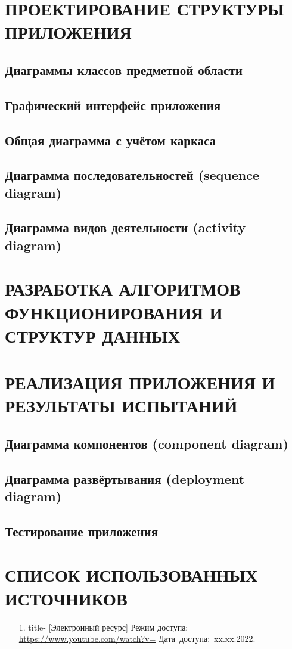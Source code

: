 \documentclass[12pt, a4paper, simple]{eskdtext}
\begin{document}
    \section{ПРОЕКТИРОВАНИЕ СТРУКТУРЫ ПРИЛОЖЕНИЯ}
    \subsection{Диаграммы классов предметной области}
    \subsection{Графический интерфейс приложения}
    \subsection{Общая диаграмма с учётом каркаса}
    \subsection{Диаграмма последовательностей (sequence diagram)}
    \subsection{Диаграмма видов деятельности (activity diagram)}
    \newpage
    
    \section{РАЗРАБОТКА АЛГОРИТМОВ ФУНКЦИОНИРОВАНИЯ И СТРУКТУР ДАННЫХ}
    \newpage
    
    \section{РЕАЛИЗАЦИЯ ПРИЛОЖЕНИЯ И РЕЗУЛЬТАТЫ ИСПЫТАНИЙ}
    \subsection{Диаграмма компонентов (component diagram)}
    \subsection{Диаграмма развёртывания (deployment diagram)}
    \subsection{Тестирование приложения}
    \newpage

    \newpage
    \section*{СПИСОК ИСПОЛЬЗОВАННЫХ ИСТОЧНИКОВ}
    \begin{enumerate}
        \item[1.] title- [Электронный ресурс]
        Режим доступа: \url{https://www.youtube.com/watch?v=}
        Дата~доступа:~xx.xx.2022.
    \end{enumerate}
    \newpage
\end{document}
